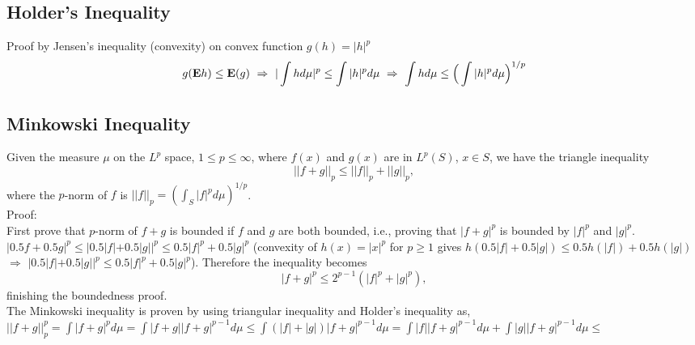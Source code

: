 \documentclass[12pt]{article}
\newcommand{\Exp}{{\text{\bf E}}}
\begin{document}
 
\subsection{Holder's Inequality}
Proof by Jensen's inequality (convexity) on convex function $g(h) = |h|^p$
\begin{equation}
   g(\Exp h) \le \Exp(g) \ \Rightarrow \ |\int h d\mu|^p \le \int |h|^p d\mu \ \Rightarrow \ \int h d\mu \le \Big(\int |h|^p d\mu\Big)^{1/p}
\end{equation}

\subsection{Minkowski Inequality}
Given the measure $\mu$ on the $L^p$ space, $1\le p \le \infty$, where $f(x)$ and $g(x)$ are in $L^p(S)$, $x \in S$, we have the triangle inequality 
\begin{equation}
   ||f+g||_p \le ||f||_p + ||g||_p,
\end{equation}
where the $p$-norm of $f$ is $||f||_p = (\int_S |f|^p d\mu )^{1/p}$. \\
Proof: \\
First prove that $p$-norm of $f+g$ is bounded if $f$ and $g$ are both bounded, i.e., proving that $|f+g|^p$ is bounded by $|f|^p$ and $|g|^p$. \\
$|0.5f+0.5g|^p \le |0.5|f| + 0.5|g||^p \le 0.5|f|^p + 0.5|g|^p$  (convexity of $h(x)=|x|^p$ for $p \ge 1$ gives $h(0.5|f|+0.5|g|) \le 0.5h(|f|) + 0.5h(|g|)$ $\Rightarrow$ $|0.5|f|+0.5|g||^p \le 0.5|f|^p + 0.5|g|^p$).
Therefore the inequality becomes 
\begin{equation}
   |f+g|^p \le 2^{p-1}(|f|^p+|g|^p),
\end{equation}
finishing the boundedness proof. \\

The Minkowski inequality is proven by using triangular inequality and Holder's inequality as, 
$||f+g||_p^p = \int |f+g|^p d\mu = \int |f+g| |f+g|^{p-1} d\mu \le \int (|f| + |g|)|f+g|^{p-1} d\mu = \int|f||f+g|^{p-1} d\mu + \int|g||f+g|^{p-1} d\mu \le $
\end{document}
